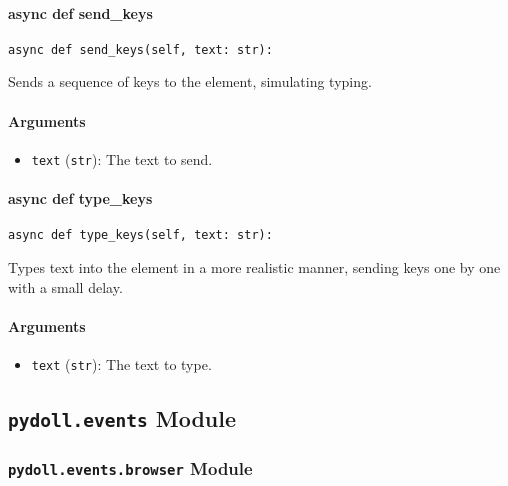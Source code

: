 \documentclass{article}
\begin{document}
\paragraph{async def send\_keys}

\begin{lstlisting}[style=pythonstyle]
async def send_keys(self, text: str):
\end{lstlisting}

\noindent Sends a sequence of keys to the element, simulating typing.

\paragraph{Arguments}

\begin{itemize}
    \item \lstinline[style=pythonstyle]|text| (\lstinline[style=pythonstyle]|str|): The text to send.
\end{itemize}

\paragraph{async def type\_keys}

\begin{lstlisting}[style=pythonstyle]
async def type_keys(self, text: str):
\end{lstlisting}

\noindent Types text into the element in a more realistic manner, sending keys one by one with a small delay.

\paragraph{Arguments}

\begin{itemize}
    \item \lstinline[style=pythonstyle]|text| (\lstinline[style=pythonstyle]|str|): The text to type.
\end{itemize}

\hrulefill

\subsection*{\texttt{pydoll.events} Module}

\subsubsection*{\texttt{pydoll.events.browser} Module}
\end{document}
